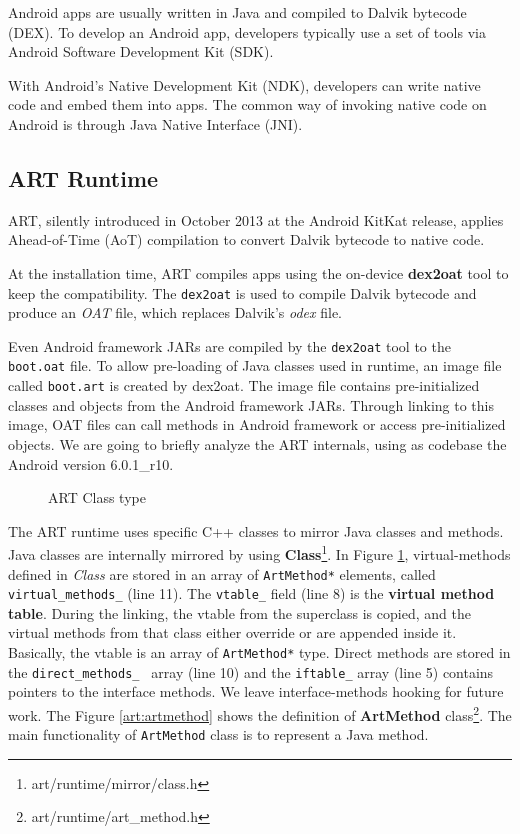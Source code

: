 Android apps are usually written in Java and compiled to Dalvik bytecode (DEX). To develop an Android app, developers typically use a set of tools via Android Software Development Kit (SDK). 

With Android's Native Development Kit (NDK), developers can write native code and embed them into apps. The common way of invoking native code on Android is through Java Native Interface (JNI).


\subsection{ART Runtime}
\label{subsec:art}

ART, silently introduced in October 2013 at the Android KitKat release, applies Ahead-of-Time (AoT) compilation to convert Dalvik bytecode to native code. 

At the installation time, ART compiles apps using the on-device \textbf{dex2oat} tool to keep the compatibility. The {\tt dex2oat} is used to compile Dalvik bytecode and produce an \textit{OAT} file, which replaces Dalvik's \textit{odex} file. 

Even Android framework JARs are compiled by the {\tt dex2oat} tool to the {\tt boot.oat} file. To allow pre-loading of Java classes used in runtime, an image file called {\tt boot.art} is created by dex2oat. The image file contains pre-initialized classes and objects from the Android framework JARs. Through linking to this image, OAT files can call methods in Android framework or access pre-initialized objects. We are going to briefly analyze the ART internals, using as codebase the Android version 6.0.1\_r10.



\begin{figure}[h!]

\caption{ART Class type}
\label{lst:artclass}
\end{figure}

The ART runtime uses specific C++ classes to mirror Java classes and methods. Java classes are internally mirrored by using \textbf{Class}\footnote{art/runtime/mirror/class.h}. In Figure \ref{lst:artclass}, virtual-methods defined in \textit{Class} are stored in an array of {\tt ArtMethod*} elements, called {\tt virtual\_methods\_} (line 11). The {\tt vtable\_} field (line 8) is the \textbf{virtual method table}. During the linking, the vtable from the superclass is copied, and the virtual methods from that class either override or are appended inside it. Basically, the vtable is an array of {\tt ArtMethod*} type. Direct methods are stored in the {\tt direct\_methods\_ } array (line 10) and the  {\tt iftable\_} array (line 5) contains pointers to the interface methods. We leave interface-methods hooking for future work. The Figure \ref{art:artmethod} shows the definition of \textbf{ArtMethod} class\footnote{art/runtime/art\_method.h}. The main functionality of {\tt ArtMethod} class is to represent a Java method.


